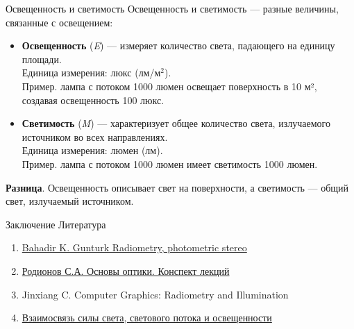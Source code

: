 \documentclass{beamer}
\begin{document}
	\begin{frame}{Освещенность и светимость}
    Освещенность и светимость --- разные величины, связанные с освещением:

    \begin{itemize}
        \item \textbf{Освещенность} (\textit{E}) --- измеряет количество света, падающего на единицу площади.\\        
         Единица измерения: люкс (лм/м$^2$).\\
         Пример. лампа с потоком 1000 люмен освещает поверхность в 10 м², создавая освещенность 100 люкс.
        
        \vspace{0.5em}
        \item \textbf{Светимость} (\textit{M}) — характеризует общее количество света, излучаемого источником во всех направлениях.\\
         Единица измерения: люмен (лм).\\
         Пример. лампа с потоком 1000 люмен имеет светимость 1000 люмен.
        
    \end{itemize}

    \vspace{0.3em}
    \textbf{Разница}. Освещенность описывает свет на поверхности, а светимость --- общий свет, излучаемый источником.
	\end{frame}

	\begin{frame}{Заключение}
		Литература
		\begin{enumerate}
			\item \href{https://www.ece.lsu.edu/gunturk/EE4780/EE4780.html}{Bahadir K. Gunturk Radiometry, photometric stereo}
			\item \href{http://aco.ifmo.ru/el_books/basics_optics/glava-2/glava-2-1.html}{Родионов С.А. Основы оптики. Конспект лекций}
			\item Jinxiang C. Computer Graphics: Radiometry and Illumination 
			\item \href{https://novolampa.ru/baza-znaniy/kandely-lyuminy-lyuksy-v-chem-raznitsa}{Взаимосвязь силы света, светового потока и освещенности}
		\end{enumerate}

	\end{frame}
	
\end{document}
